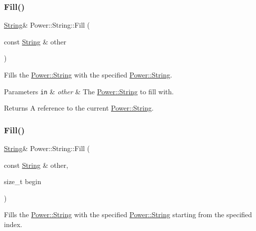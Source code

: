 \subsubsection{\texorpdfstring{Fill()}{Fill()}\hspace{0.1cm}{\footnotesize\ttfamily [1/12]}}
{\footnotesize\ttfamily \hyperlink{class_power_1_1_string}{String}\& Power\+::\+String\+::\+Fill (\begin{DoxyParamCaption}\item[{const \hyperlink{class_power_1_1_string}{String} \&}]{other }\end{DoxyParamCaption})\hspace{0.3cm}{\ttfamily [inline]}}



Fills the \hyperlink{class_power_1_1_string}{Power\+::\+String} with the specified \hyperlink{class_power_1_1_string}{Power\+::\+String}. 


\begin{DoxyParams}[1]{Parameters}
\mbox{\tt in}  & {\em other} & The \hyperlink{class_power_1_1_string}{Power\+::\+String} to fill with. \\
\hline
\end{DoxyParams}
\begin{DoxyReturn}{Returns}
A reference to the current \hyperlink{class_power_1_1_string}{Power\+::\+String}. 
\end{DoxyReturn}
\mbox{\label{class_power_1_1_string_a9f82a188fdb2c48185075dd778a1a048}} 
\subsubsection{\texorpdfstring{Fill()}{Fill()}\hspace{0.1cm}{\footnotesize\ttfamily [2/12]}}
{\footnotesize\ttfamily \hyperlink{class_power_1_1_string}{String}\& Power\+::\+String\+::\+Fill (\begin{DoxyParamCaption}\item[{const \hyperlink{class_power_1_1_string}{String} \&}]{other,  }\item[{size\+\_\+t}]{begin }\end{DoxyParamCaption})\hspace{0.3cm}{\ttfamily [inline]}}



Fills the \hyperlink{class_power_1_1_string}{Power\+::\+String} with the specified \hyperlink{class_power_1_1_string}{Power\+::\+String} starting from the specified index. 


